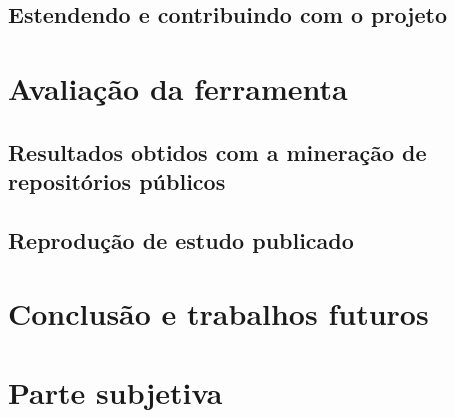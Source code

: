 \documentclass[a4paper, 12pt, twoside]{book}
\begin{document}
    
    \section{Estendendo e contribuindo com o projeto}

    
\chapter{Avaliação da ferramenta} \label{ch:avaliacao}

    \section{Resultados obtidos com a mineração de repositórios públicos}

    \section{Reprodução de estudo publicado}

\chapter{Conclusão e trabalhos futuros} \label{ch:conclusao}

\chapter{Parte subjetiva} \label{ch:subjetiva}



\end{document}
